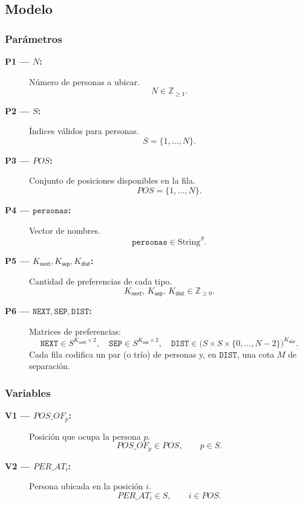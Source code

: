 
\subsection{Modelo}\label{sec:05-reunion-modelo}

\subsubsection*{Parámetros}

\begin{description}
  \item[\textbf{P1 — \(N\):}] Número de personas a ubicar.
  \[
    N\in\mathbb{Z}_{\ge 1}.
  \]

  \item[\textbf{P2 — \(S\):}] Índices válidos para personas.
  \[
    S=\{1,\dots,N\}.
  \]

  \item[\textbf{P3 — \(POS\):}] Conjunto de posiciones disponibles en la fila.
  \[
    POS=\{1,\dots,N\}.
  \]

  \item[\textbf{P4 — \(\texttt{personas}\):}] Vector de nombres.
  \[
    \texttt{personas}\in \text{String}^{S}.
  \]

  \item[\textbf{P5 — \(K_{\textsf{next}}, K_{\textsf{sep}}, K_{\textsf{dist}}\):}] Cantidad de preferencias de cada tipo.
  \[
    K_{\textsf{next}},\,K_{\textsf{sep}},\,K_{\textsf{dist}}\in\mathbb{Z}_{\ge 0}.
  \]

  \item[\textbf{P6 — \(\texttt{NEXT},\texttt{SEP},\texttt{DIST}\):}] Matrices de preferencias:
  \[
    \texttt{NEXT}\in S^{K_{\textsf{next}}\times 2},\quad
    \texttt{SEP}\in S^{K_{\textsf{sep}}\times 2},\quad
    \texttt{DIST}\in \big(S\times S\times \{0,\dots,N-2\}\big)^{K_{\textsf{dist}}}.
  \]
  Cada fila codifica un par (o trío) de personas y, en \(\texttt{DIST}\), una cota \(M\) de separación.
\end{description}

\subsubsection*{Variables}

\begin{description}
  \item[\textbf{V1 — \(POS\_OF_p\):}] Posición que ocupa la persona \(p\).
  \[
    POS\_OF_p\in POS,\qquad p\in S.
  \]

  \item[\textbf{V2 — \(PER\_AT_i\):}] Persona ubicada en la posición \(i\).
  \[
    PER\_AT_i\in S,\qquad i\in POS.
  \]
\end{description}


